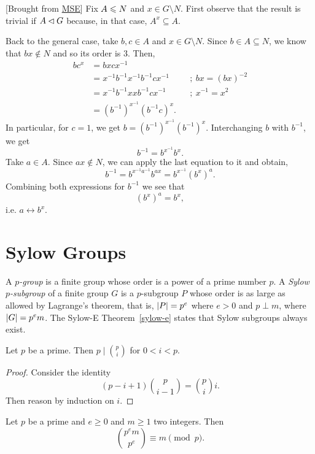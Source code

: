 \begin{solution} {[Brought from \href{https://math.stackexchange.com/a/1485048/269050}{MSE}]} Fix $A\leqslant N$ and $x\in G\setminus N$. First observe that the result is trivial if $A\lhd G$ because, in that case, $A^x\subseteq A$.

Back to the general case, take $b,c\in A$ and $x\in G\setminus N$. Since $b\in A\subseteq N$, we know that $bx\notin N$ and so its order is $3$. Then,
\begin{align*}
    bc^x &= bxcx^{-1}\\
        &= x^{-1}b^{-1}x^{-1}b^{-1}cx^{-1}  &&;\ bx=(bx)^{-2}\\
        &= x^{-1}b^{-1}xxb^{-1}cx^{-1}      &&;\ x^{-1}=x^2\\
        &= (b^{-1})^{x^{-1}}(b^{-1}c)^x.
\end{align*}
In particular, for $c=1$, we get $b=(b^{-1})^{x^{-1}}(b^{-1})^x$. Interchanging $b$ with $b^{-1}$, we get
$$
    b^{-1} = b^{x^{-1}}b^x.
$$
Take $a\in A$. Since $ax\notin N$, we can apply the last equation to it and obtain,
$$
    b^{-1} = b^{x^{-1}a^{-1}}b^{ax} = b^{x^{-1}}(b^x)^a.
$$
Combining both expressions for $b^{-1}$ we see that
$$
    (b^x)^a=b^x,
$$
i.e. $a\leftrightarrow b^x$.  \end{solution}

\section{Sylow Groups}

\begin{defns}
    A \textsl{$p$-group} is a finite group whose order is a power of a prime number $p$. A \textsl{Sylow $p$-subgroup} of a finite group $G$ is a $p$-subgroup $P$ whose order is as large as allowed by Lagrange's theorem, that is, $\left\vert{P}\right\vert=p^e$ where $e > 0$ and $p\perp m$, where $\left\vert{G}\right\vert = p^em$. The\/ \textrm{\rm Sylow-E Theorem~\ref{sylow-e}} states that Sylow subgroups always exist.
\end{defns}

\begin{lem}
    Let $p$ be a prime. Then $p\mid\binom pi$ for $0<i<p$.
\end{lem}

\begin{proof} Consider the identity
$$
    (p-i+1)\binom p{i-1}=\binom pii.
$$
Then reason by induction on $i$.  \end{proof}

\begin{prop}
    Let $p$ be a prime and $e\ge0$ and $m\ge1$ two integers. Then
    $$
        \binom{p^em}{p^e} \equiv m\pmod p.
    $$
\end{prop}

